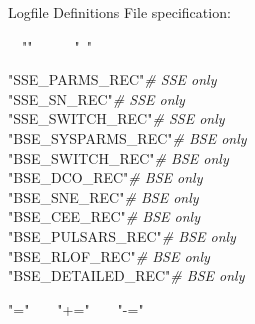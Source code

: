 \tabto{3em}{[$\ x\ $]}



\tabto{3em}{\textbar}

\tabto{3em}{\#}
\setlength{\parskip}{6pt}

\bigskip
Logfile Definitions File specification:

\hfill
\begin{minipage}{\dimexpr\textwidth-2em}
    \setlength{\parskip}{6pt}
    \rab\tabto{7em}{::=}\tabto{9em}\lcb{}\rab\rcb

    \rab\tabto{7em}{::=}\tabto{9em}\rab\ \rab\ "\lcb"\ \lcb\ \lsb\ \rab\ \rsb\ \rcb\ "\ \rcb"\ \rab

    \rab\tabto{7em}{::=}\tabto{9em}"SSE\_PARMS\_REC"\tabto{23em}\textbar\tabto{28em}\textit{\# SSE only} \\
    \tabto{9em}"SSE\_SN\_REC"\tabto{23em}\textbar\tabto{28em}\textit{\# SSE only} \\
    \tabto{9em}"SSE\_SWITCH\_REC"\tabto{23em}\textbar\tabto{28em}\textit{\# SSE only} \\
    \tabto{9em}"BSE\_SYSPARMS\_REC"\tabto{23em}\textbar\tabto{28em}\textit{\# BSE only} \\
    \tabto{9em}"BSE\_SWITCH\_REC"\tabto{23em}\textbar\tabto{28em}\textit{\# BSE only} \\       \tabto{9em}"BSE\_DCO\_REC"\tabto{23em}\textbar\tabto{28em}\textit{\# BSE only} \\
    \tabto{9em}"BSE\_SNE\_REC"\tabto{23em}\textbar\tabto{28em}\textit{\# BSE only} \\
    \tabto{9em}"BSE\_CEE\_REC"\tabto{23em}\textbar\tabto{28em}\textit{\# BSE only} \\
    \tabto{9em}"BSE\_PULSARS\_REC"\tabto{23em}\textbar\tabto{28em}\textit{\# BSE only} \\
    \tabto{9em}"BSE\_RLOF\_REC"\tabto{23em}\textbar\tabto{28em}\textit{\# BSE only} \\
    \tabto{9em}"BSE\_DETAILED\_REC"\tabto{23em}\textbar\tabto{28em}\textit{\# BSE only}

    \rab\tabto{7em}{::=}\tabto{9em}"="\ \ \textbar\ \ "+="\ \ \textbar\ \ "-="


\end{minipage}
